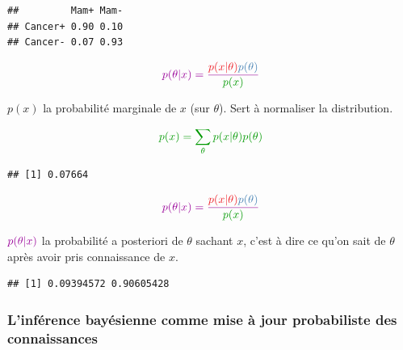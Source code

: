 \documentclass[
  a4paper,11pt,twoside,onecolumn,openright,final,oldfontcommands]{memoir}
\newenvironment{Shaded}{\begin{snugshade}}{\end{snugshade}}
\newcommand{\FunctionTok}[1]{\textcolor[rgb]{0.00,0.00,0.00}{#1}}
\newcommand{\NormalTok}[1]{#1}
\newcommand{\OtherTok}[1]{\textcolor[rgb]{0.56,0.35,0.01}{#1}}
\newcommand{\SpecialCharTok}[1]{\textcolor[rgb]{0.00,0.00,0.00}{#1}}
\newcommand{\StringTok}[1]{\textcolor[rgb]{0.31,0.60,0.02}{#1}}
\theoremstyle{definition}
\theoremstyle{definition}
\theoremstyle{definition}
\theoremstyle{definition}
\theoremstyle{remark}
\begin{document}
\begin{verbatim}
##         Mam+ Mam-
## Cancer+ 0.90 0.10
## Cancer- 0.07 0.93
\end{verbatim}

\[
\color{purple}{p(\theta \vert x)} = \dfrac{\color{orangered}{p(x\vert \theta)} \color{steelblue}{p(\theta)}}{\color{green}{p(x)}}
\]

{ \(p(x)\) la probabilité marginale de \(x\) (sur \(\theta\)). Sert à normaliser la distribution.}

\[\color{green}{p(x)=\sum\limits_{\theta}p(x|\theta)p(\theta)}\]

\begin{Shaded}
\end{Shaded}

\begin{verbatim}
## [1] 0.07664
\end{verbatim}

\[
\color{purple}{p(\theta \vert x)} = \dfrac{\color{orangered}{p(x\vert \theta)} \color{steelblue}{p(\theta)}}{\color{green}{p(x)}}
\]

\(\color{purple}{p(\theta \vert x)}\) { la probabilité a posteriori de \(\theta\) sachant \(x\), c'est à dire ce qu'on sait de \(\theta\) après avoir pris connaissance de \(x\).}

\begin{Shaded}
\end{Shaded}

\begin{verbatim}
## [1] 0.09394572 0.90605428
\end{verbatim}

\hypertarget{linfuxe9rence-bayuxe9sienne-comme-mise-uxe0-jour-probabiliste-des-connaissances}{%
\subsubsection{L'inférence bayésienne comme mise à jour probabiliste des connaissances}\label{linfuxe9rence-bayuxe9sienne-comme-mise-uxe0-jour-probabiliste-des-connaissances}}
\end{document}
